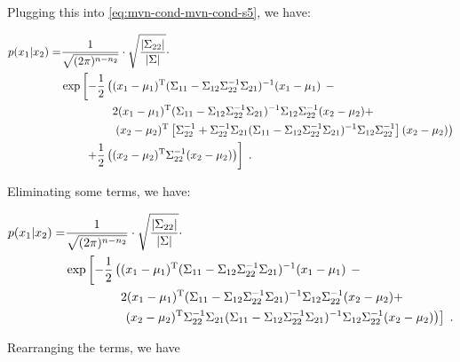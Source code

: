 \documentclass[a4paper,12pt,twoside]{book}
\begin{document}
Plugging this into \eqref{eq:mvn-cond-mvn-cond-s5}, we have:

\begin{equation} \label{eq:mvn-cond-mvn-cond-s6}
\begin{split}
p(x_1|x_2) = &\frac{1}{\sqrt{(2 \pi)^{n-n_2}}} \cdot \sqrt{\frac{|\Sigma_{22}|}{|\Sigma|}} \cdot \\
&\exp \left[ -\frac{1}{2} \left( (x_1-\mu_1)^\mathrm{T} (\Sigma_{11} - \Sigma_{12} \Sigma_{22}^{-1} \Sigma_{21})^{-1} (x_1-\mu_1) \right. \right. - \\
&\hphantom{\exp \left[ -\frac{1}{2} \left( \right. \right.} 2 (x_1-\mu_1)^\mathrm{T} (\Sigma_{11} - \Sigma_{12} \Sigma_{22}^{-1} \Sigma_{21})^{-1} \Sigma_{12} \Sigma_{22}^{-1} (x_2-\mu_2) + \\
&\hphantom{\exp \left[ -\frac{1}{2} \left( \right. \right.} \left. (x_2-\mu_2)^\mathrm{T} \left[ \Sigma_{22}^{-1} + \Sigma_{22}^{-1} \Sigma_{21} (\Sigma_{11} - \Sigma_{12} \Sigma_{22}^{-1} \Sigma_{21})^{-1} \Sigma_{12} \Sigma_{22}^{-1} \right] (x_2-\mu_2) \right) \\
&\hphantom{\exp \left[\right.} \left. + \frac{1}{2} \left( (x_2-\mu_2)^\mathrm{T} \Sigma_{22}^{-1} (x_2-\mu_2) \right) \right] \; .
\end{split}
\end{equation}

Eliminating some terms, we have:

\begin{equation} \label{eq:mvn-cond-mvn-cond-s7}
\begin{split}
p(x_1|x_2) = &\frac{1}{\sqrt{(2 \pi)^{n-n_2}}} \cdot \sqrt{\frac{|\Sigma_{22}|}{|\Sigma|}} \cdot \\
&\exp \left[ -\frac{1}{2} \left( (x_1-\mu_1)^\mathrm{T} (\Sigma_{11} - \Sigma_{12} \Sigma_{22}^{-1} \Sigma_{21})^{-1} (x_1-\mu_1) \right. \right. - \\
&\hphantom{\exp \left[ -\frac{1}{2} \left( \right. \right.} 2 (x_1-\mu_1)^\mathrm{T} (\Sigma_{11} - \Sigma_{12} \Sigma_{22}^{-1} \Sigma_{21})^{-1} \Sigma_{12} \Sigma_{22}^{-1} (x_2-\mu_2) + \\
&\hphantom{\exp \left[ -\frac{1}{2} \left( \right. \right.} \left. \left. (x_2-\mu_2)^\mathrm{T} \Sigma_{22}^{-1} \Sigma_{21} (\Sigma_{11} - \Sigma_{12} \Sigma_{22}^{-1} \Sigma_{21})^{-1} \Sigma_{12} \Sigma_{22}^{-1} (x_2-\mu_2) \right) \right] \; .
\end{split}
\end{equation}

Rearranging the terms, we have
\end{document}
